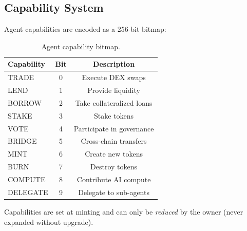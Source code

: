 \subsection{Capability System}

Agent capabilities are encoded as a 256-bit bitmap:

\begin{table}[t]
\centering
\begin{tabular}{lcc}
\toprule
\textbf{Capability} & \textbf{Bit} & \textbf{Description} \\
\midrule
TRADE & 0 & Execute DEX swaps \\
LEND & 1 & Provide liquidity \\
BORROW & 2 & Take collateralized loans \\
STAKE & 3 & Stake tokens \\
VOTE & 4 & Participate in governance \\
BRIDGE & 5 & Cross-chain transfers \\
MINT & 6 & Create new tokens \\
BURN & 7 & Destroy tokens \\
COMPUTE & 8 & Contribute AI compute \\
DELEGATE & 9 & Delegate to sub-agents \\
\bottomrule
\end{tabular}
\caption{Agent capability bitmap.}
\label{tab:capabilities}
\end{table}

Capabilities are set at minting and can only be \emph{reduced} by the owner (never expanded without upgrade).

